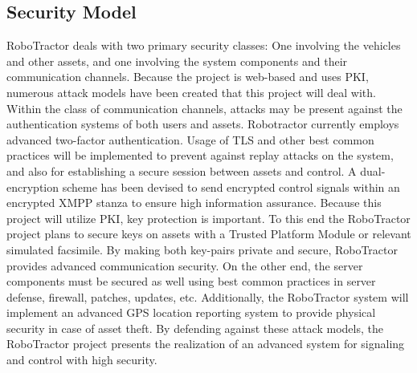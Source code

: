 \documentclass[conference,12pt]{IEEEtran}
\begin{document}
\subsection{Security Model}
RoboTractor deals with two primary security classes: One involving the vehicles
and other assets, and one involving the system components and their communication channels.
Because the project is web-based and uses PKI, numerous attack models have
been created that this project will deal with. Within the class of communication channels,
attacks may be present against the authentication systems of both users and assets. Robotractor currently employs
advanced two-factor authentication. Usage of TLS and other best common practices will be implemented to prevent
against replay attacks on the system, and also for establishing a secure session between assets and control.
A dual-encryption scheme has been devised to send encrypted control signals within an encrypted XMPP stanza
to ensure high information assurance. Because this project will utilize PKI, key protection is important. To this end
the RoboTractor project plans to secure keys on assets with a Trusted Platform Module or relevant simulated facsimile.
By making both key-pairs private and secure, RoboTractor provides advanced communication security.
On the other end, the server components must be secured as well using best common practices in server defense, firewall,
patches, updates, etc. Additionally, the RoboTractor system will implement an advanced GPS location reporting system
to provide physical security in case of asset theft. By defending against these attack models, the RoboTractor project
presents the realization of an advanced system for signaling and control with high security. 
\end{document}
